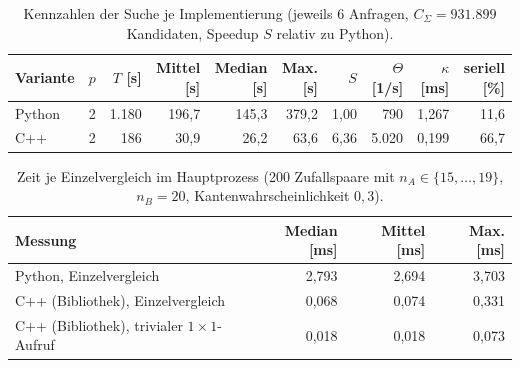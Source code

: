 \begin{table}[h]
	\centering
	\small
	\caption{Kennzahlen der Suche je Implementierung (jeweils $6$ Anfragen, $C_\Sigma = 931.899$ Kandidaten, Speedup $S$ relativ zu Python).}
	\label{tab:backend_summary}
	\begin{tabular}{@{}lrrrrrrrrr@{}}
		\toprule
		Variante & $p$ & $T$ [s] & Mittel [s] & Median [s] & Max. [s] & $S$ & $\Theta$ [1/s] & $\kappa$ [ms] & seriell [\%] \\
		\midrule
		Python & 2 & 1.180 & 196{,}7 & 145{,}3 & 379{,}2 & 1{,}00 & 790 & 1{,}267 & 11{,}6 \\
		C++ & 2 & 186 & 30{,}9 & 26{,}2 & 63{,}6 & 6{,}36 & 5.020 & 0{,}199 & 66{,}7 \\
		\bottomrule
	\end{tabular}
\end{table}

\begin{table}[h]
	\centering
	\small
	\caption{Zeit je Einzelvergleich im Hauptprozess (200 Zufallspaare mit $n_A\in\{15,\dots,19\}$, $n_B=20$, Kantenwahrscheinlichkeit $0{,}3$).}
	\label{tab:backend_calibration}
	\begin{tabular}{@{}lrrr@{}}
		\toprule
		Messung & Median [ms] & Mittel [ms] & Max. [ms] \\
		\midrule
		Python, Einzelvergleich & 2{,}793 & 2{,}694 & 3{,}703 \\
		C++ (Bibliothek), Einzelvergleich & 0{,}068 & 0{,}074 & 0{,}331 \\
		C++ (Bibliothek), trivialer $1\times1$-Aufruf & 0{,}018 & 0{,}018 & 0{,}073 \\
		\bottomrule
	\end{tabular}
\end{table}
